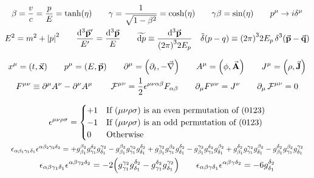 \begin{gather*}
        \beta
        = \frac{v}{c}
        = \frac{p}{E}
        = \tanh(\eta)
        \qquad
        \gamma
        = \frac{1}{\sqrt{1-\beta^2}}
        = \cosh(\eta)
        \qquad
        \gamma\beta = \sin(\eta)
        \qquad
        p^\mu \to i \delta^\mu
        \\
        E^2 = m^2 + \abs{p}^2
        \qquad
        \frac{\dd[3]{\va{p}'}}{E'} = \frac{\dd[3]{\va{p}}}{E}
        \qquad
        \widetilde{\dd{p}} \equiv \frac{\dd[3]{\va{p}}}{\qty(2\pi)^32E_p}
        \quad
        \tilde{\delta}\qty(p-q) \equiv \qty(2\pi)^32E_p\Ddelta[3](\va{p}-\va{q})
\end{gather*}

\begin{gather*}
        x^{\mu} = (t, \va{x})
        \qquad
        p^{\mu} = (E, \va{p})
        \qquad
        \partial^{\mu} = \qty(\partial_t, -\va{\nabla})
        \qquad
        A^{\mu} = \qty(\phi, \va{A})
        \qquad
        J^{\mu} = \qty(\rho, \va{J})
        \\
        F^{\mu\nu} \equiv \partial^\mu A^\nu - \partial^\nu A^\mu
        \qquad
        \operatorname{\mathcal{F}}^{\mu\nu} = \frac{1}{2}\epsilon^{\mu\nu\alpha\beta}F_{\alpha\beta}
        \qquad
        \partial_\mu F^{\mu\nu} = J^{\nu}
        \qquad
        \partial_\mu \operatorname{\mathcal{F}}^{\mu\nu} = 0
\end{gather*}

\begin{gather*}
        \epsilon^{\mu\nu\rho\sigma} = \begin{cases}
                +1 &\text{If $(\mu\nu\rho\sigma)$ is an even permutation of $(0123)$} \\
                -1 &\text{If $(\mu\nu\rho\sigma)$ is an odd permutation of $(0123)$} \\
                0  &\text{Otherwise} \\
        \end{cases}
        \\
        \resizebox{\linewidth}{!}{$\displaystyle
                \epsilon_{\alpha\beta_1\gamma_1\delta_1}\epsilon^{\alpha\beta_2\gamma_2\delta_2}
                =
                + g^{\beta_2}_{\beta_1}g^{\delta_2}_{\gamma_1}g^{\gamma_2}_{\delta_1}
                - g^{\beta_2}_{\beta_1}g^{\gamma_2}_{\gamma_1}g^{\delta_2}_{\delta_1}
                + g^{\gamma_2}_{\beta_1}g^{\beta_2}_{\gamma_1}g^{\delta_2}_{\delta_1}
                - g^{\gamma_2}_{\beta_1}g^{\delta_2}_{\gamma_1}g^{\beta_2}_{\delta_1}
                + g^{\delta_2}_{\beta_1}g^{\gamma_2}_{\gamma_1}g^{\beta_2}_{\delta_1}
                - g^{\delta_2}_{\beta_1}g^{\beta_2}_{\gamma_1}g^{\gamma_2}_{\delta_1}
        $}
        \\
        \epsilon_{\alpha\beta\gamma_1\delta_1}\epsilon^{\alpha\beta\gamma_2\delta_2} = -2\qty(g_{\gamma_1}^{\gamma_2}g_{\delta_1}^{\delta_2} - g_{\gamma_1}^{\delta_2}g_{\delta_1}^{\gamma_2})
        \qquad
        \epsilon_{\alpha\beta\gamma\delta_1}\epsilon^{\alpha\beta\gamma\delta_2} = -6g_{\delta_1}^{\delta_2}
\end{gather*}
